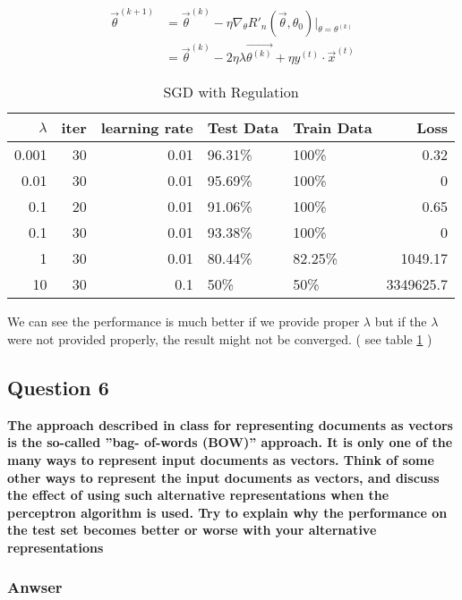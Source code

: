 \documentclass{article}
\begin{document}
\begin{align*}
 \vec{\theta}^{(k+1)}&=\vec{\theta}^{(k)} - \eta \nabla_\theta R'_n(\vec{\theta}, \theta_0) | _{\theta = \theta^{(k)}} \\ 
 &= \vec{\theta}^{(k)} - 2\eta\lambda\vec{\theta^{(k)}} + \eta y^{(t)} \cdot \vec{x}^{(t)}
\end{align*}

\begin{table}[htb]
\caption{\label{tab:sgd-regulation}SGD with Regulation}
\centering
\begin{tabular}{rrr|llr}
\hline
$\lambda$ & iter & learning rate & Test Data & Train Data & Loss\\
\hline
0.001 & 30 & 0.01 & 96.31\% & 100\% & 0.32\\
0.01 & 30 & 0.01 & 95.69\% & 100\% & 0\\
0.1 & 20 & 0.01 & 91.06\% & 100\% & 0.65\\
0.1 & 30 & 0.01 & 93.38\% & 100\% & 0\\
1 & 30 & 0.01 & 80.44\% & 82.25\% & 1049.17\\
10 & 30 & 0.1 & 50\% & 50\% & 3349625.7\\
\hline
\end{tabular}
\end{table}

We can see the performance is much better if we provide proper $\lambda$ but if the $\lambda$ were not provided properly, the result might not be converged. ( see table \ref{tab:sgd-regulation} )

\subsection{Question 6}
\label{sec-1-6}

\textbf{The approach described in class for representing documents as vectors is the so-called ”bag- of-words (BOW)” approach. It is only one of the many ways to represent input documents as vectors. Think of some other ways to represent the input documents as vectors, and discuss the effect of using such alternative representations when the perceptron algorithm is used. Try to explain why the performance on the test set becomes better or worse with your alternative representations}

\subsubsection{Anwser}
\label{sec-1-6-1}
\end{document}
